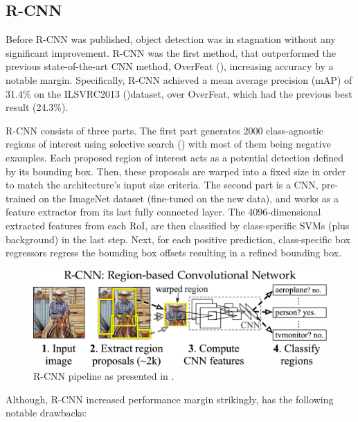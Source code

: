 \subsection{R-CNN}
Before R-CNN was published, object detection was in stagnation without any significant improvement. R-CNN was the first method, that outperformed the previous state-of-the-art CNN method, OverFeat (\cite{sermanet2013overfeat}), increasing accuracy by a notable margin. Specifically, R-CNN achieved a mean average precision (mAP) of 31.4\% on the ILSVRC2013 (\cite{deng2009imagenet})dataset, over OverFeat, which had the previous best result (24.3\%).

R-CNN consists of three parts. The first part generates 2000 class-agnostic regions of interest using selective search (\cite{uijlings2013selective}) with most of them being negative examples. Each proposed region of interest acts as a potential detection defined by its bounding box. Then, these proposals are warped into a fixed size in order to match the architecture's input size criteria. 
The second part is a CNN, pre-trained on the ImageNet dataset (fine-tuned on the new data), and works as a feature extractor from its last fully connected layer.
The 4096-dimensional extracted features from each RoI, are then classified by class-specific SVMs (plus background) in the last step. Next, for each positive prediction, class-specific box regressors regress the bounding box offsets resulting in a refined bounding box.

\begin{figure}[!htb]
  \centering
  \includegraphics[width=12cm]{figures/ch2/fig2.png}
  \caption{R-CNN pipeline as presented in \cite{girshick2014rich}.}
  \label{fig2}
\end{figure}

Although, R-CNN increased performance margin strikingly, has the following notable drawbacks:

